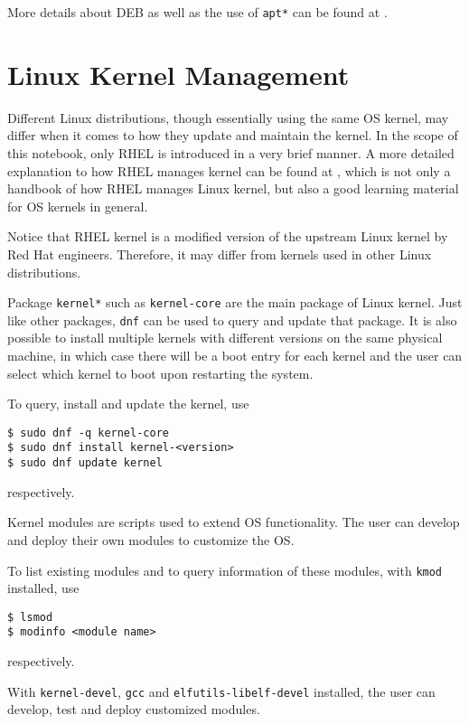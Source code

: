 More details about DEB as well as the use of \verb|apt*| can be found at \cite{debian2024debianpackagemanagement}.

\section{Linux Kernel Management}

Different Linux distributions, though essentially using the same OS kernel, may differ when it comes to how they update and maintain the kernel. In the scope of this notebook, only RHEL is introduced in a very brief manner. A more detailed explanation to how RHEL manages kernel can be found at \cite{redhat2022kernel}, which is not only a handbook of how RHEL manages Linux kernel, but also a good learning material for OS kernels in general.

Notice that RHEL kernel is a modified version of the upstream Linux kernel by Red Hat engineers. Therefore, it may differ from kernels used in other Linux distributions.

Package \verb|kernel*| such as \verb|kernel-core| are the main package of Linux kernel. Just like other packages, \verb|dnf| can be used to query and update that package. It is also possible to install multiple kernels with different versions on the same physical machine, in which case there will be a boot entry for each kernel and the user can select which kernel to boot upon restarting the system.

To query, install and update the kernel, use
\begin{lstlisting}
$ sudo dnf -q kernel-core
$ sudo dnf install kernel-<version>
$ sudo dnf update kernel
\end{lstlisting}
respectively.

Kernel modules are scripts used to extend OS functionality. The user can develop and deploy their own modules to customize the OS.

To list existing modules and to query information of these modules, with \verb|kmod| installed, use
\begin{lstlisting}
$ lsmod
$ modinfo <module name>
\end{lstlisting}
respectively.

With \verb|kernel-devel|, \verb|gcc| and \verb|elfutils-libelf-devel| installed, the user can develop, test and deploy customized modules.

